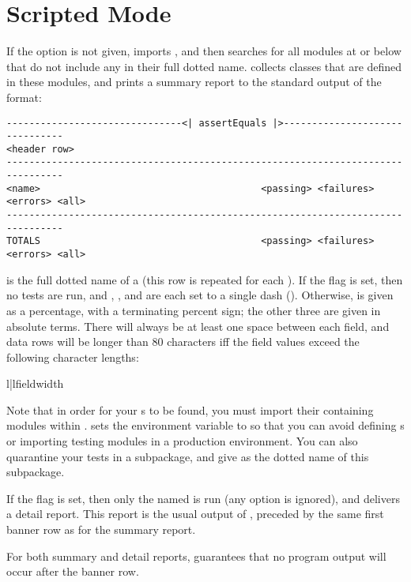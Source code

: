 \chapter{Scripted Mode \label{scripted}}

If the  option is not given, 
imports , and then searches  for all modules at or
below  that do not include any  in their full dotted
name.  collects  classes that are defined
in these modules, and prints a summary report to the standard output of the
format:


\begin{verbatim}
-------------------------------<| assertEquals |>-------------------------------
<header row>
--------------------------------------------------------------------------------
<name>                                       <passing> <failures> <errors> <all>
--------------------------------------------------------------------------------
TOTALS                                       <passing> <failures> <errors> <all>
\end{verbatim}

 is the full dotted name of a  (this row is
repeated for each ). If the  flag is set,
then no tests are run, and , , and
 are each set to a single dash (\code{-}). Otherwise,
 is given as a percentage, with a terminating percent sign; the
other three are given in absolute terms. There will always be at least one space
between each field, and data rows will be longer than 80 characters iff the
field values exceed the following character lengths:

\begin{tableii}{l|l}{}{field}{width}
\end{tableii}

Note that in order for your s to be found, you must import their
containing modules within .  sets the
 environment variable to  so that you
can avoid defining s or importing testing modules in a
production environment. You can also quarantine your tests in a subpackage, and
give  as the dotted name of this subpackage.

If the  flag is set, then only the named
 is run (any  option is ignored), and
 delivers a detail report. This report is the usual output
of , preceded by the same first banner row as for
the summary report.

For both summary and detail reports,  guarantees that no
program output will occur after the banner row.
